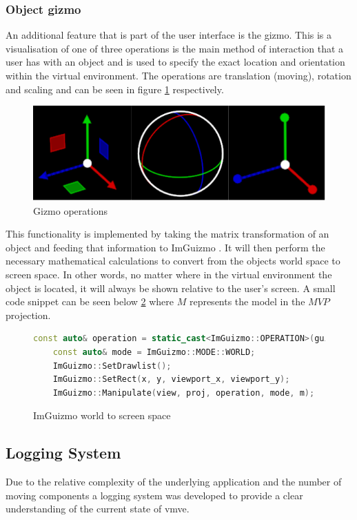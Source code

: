 \documentclass[11pt]{article}
\begin{document}
\subsubsection{Object gizmo}
An additional feature that is part of the user interface is the gizmo. This is a
visualisation of one of three operations is the main method of interaction that
a user has with an object and is used to specify the exact location and
orientation within the virtual environment. The operations are translation
(moving), rotation and scaling and can be seen in figure \ref{fig:gizmo}
respectively.
\begin{figure}[H]
  \centering
  \includegraphics[width=\textwidth]{images/gizmo.png}
  \caption{Gizmo operations}
  \label{fig:gizmo}
\end{figure}

This functionality is implemented by taking the matrix transformation of an
object and feeding that information to ImGuizmo \cite{imguizmo}. It will then
perform the necessary mathematical calculations to convert from the objects
world space to screen space. In other words, no matter where in the virtual
environment the object is located, it will always be shown relative to the user's
screen. A small code snippet can be seen below \ref{fig:imguizmo_code} where
\(M\) represents the model in the \(MVP\) projection.


\begin{figure}[H]
  \centering
  \begin{lstlisting}[language=C++]
    const auto& operation = static_cast<ImGuizmo::OPERATION>(guizmo_operation);
    const auto& mode = ImGuizmo::MODE::WORLD;
    ImGuizmo::SetDrawlist();
    ImGuizmo::SetRect(x, y, viewport_x, viewport_y);
    ImGuizmo::Manipulate(view, proj, operation, mode, m);
  \end{lstlisting}
  \caption{ImGuizmo world to screen space}
  \label{fig:imguizmo_code}
\end{figure}

\subsection{Logging System}
Due to the relative complexity of the underlying application and the number of
moving components a logging system was developed to provide a clear
understanding of the current state of \gls*{vmve}. 
\end{document}
